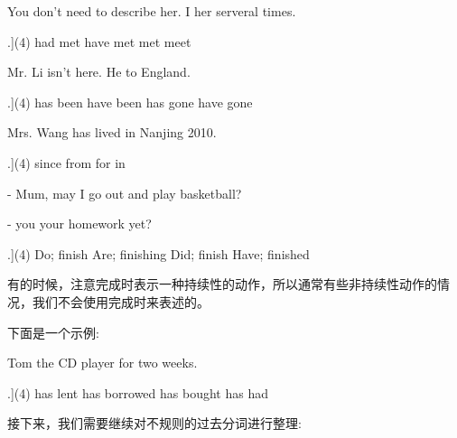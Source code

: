 \documentclass[a4paper]{article}
\begin{document}
\begin{question}
 You don't need to describe her. I \blank[width=1cm]{} her serveral times.

  \begin{tasks}[counter-format=tsk[A].](4)
   \task had met
   \task have met
   \task met
   \task meet
   \end{tasks}
\end{question}

\begin{question}
 Mr. Li isn't here. He \blank[width=1cm]{} to England.

  \begin{tasks}[counter-format=tsk[A].](4)
   \task has been
   \task have been
   \task has gone
   \task have gone
   \end{tasks}
\end{question}

\begin{question}
 Mrs. Wang has lived in Nanjing \blank[width=1cm]{} 2010.

  \begin{tasks}[counter-format=tsk[A].](4)
   \task since
   \task from
   \task for
   \task in
   \end{tasks}
\end{question}
\begin{question}
- Mum, may I go out and play basketball?

- \blank[width=1cm]{} you \blank[width=1cm]{} your homework yet?

  \begin{tasks}[counter-format=tsk[A].](4)
   \task Do; finish
   \task Are; finishing
   \task Did; finish
   \task Have; finished
   \end{tasks}
\end{question}

有的时候，注意完成时表示一种持续性的动作，所以通常有些非持续性动作的情况，我们不会使用完成时来表述的。

下面是一个示例:

\begin{question}
Tom \blank[width=1cm]{} the CD player for two weeks.

  \begin{tasks}[counter-format=tsk[A].](4)
   \task has lent
   \task has borrowed
   \task has bought
   \task has had
   \end{tasks}
\end{question}

接下来，我们需要继续对不规则的过去分词进行整理:
\end{document}
